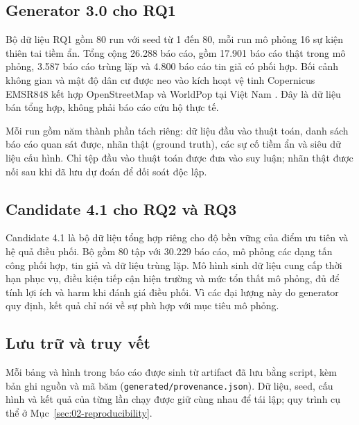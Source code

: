 \subsection{Generator 3.0 cho RQ1}
Bộ dữ liệu RQ1 gồm 80 run với seed từ 1 đến 80, mỗi run mô phỏng 16 sự kiện thiên tai tiềm ẩn. Tổng cộng 26.288 báo cáo, gồm 17.901 báo cáo thật trong mô phỏng, 3.587 báo cáo trùng lặp và 4.800 báo cáo tin giả có phối hợp. Bối cảnh không gian và mật độ dân cư được neo vào kích hoạt vệ tinh Copernicus EMSR848 kết hợp OpenStreetMap và WorldPop tại Việt Nam \citep{copernicusEMSR848,worldpop2025vietnam}. Đây là dữ liệu bán tổng hợp, không phải báo cáo cứu hộ thực tế.

Mỗi run gồm năm thành phần tách riêng: dữ liệu đầu vào thuật toán, danh sách báo cáo quan sát được, nhãn thật (ground truth), các sự cố tiềm ẩn và siêu dữ liệu cấu hình. Chỉ tệp đầu vào thuật toán được đưa vào suy luận; nhãn thật được nối sau khi đã lưu dự đoán để đối soát độc lập.

\subsection{Candidate 4.1 cho RQ2 và RQ3}
Candidate 4.1 là bộ dữ liệu tổng hợp riêng cho độ bền vững của điểm ưu tiên và hệ quả điều phối. Bộ gồm 80 tập với 30.229 báo cáo, mô phỏng các dạng tấn công phối hợp, tin giả và dữ liệu trùng lặp. Mô hình sinh dữ liệu cung cấp thời hạn phục vụ, điều kiện tiếp cận hiện trường và mức tổn thất mô phỏng, đủ để tính lợi ích và harm khi đánh giá điều phối. Vì các đại lượng này do generator quy định, kết quả chỉ nói về sự phù hợp với mục tiêu mô phỏng.

\subsection{Lưu trữ và truy vết}
Mỗi bảng và hình trong báo cáo được sinh từ artifact đã lưu bằng script, kèm bản ghi nguồn và mã băm (\texttt{generated/provenance.json}). Dữ liệu, seed, cấu hình và kết quả của từng lần chạy được giữ cùng nhau để tái lập; quy trình cụ thể ở Mục~\ref{sec:02-reproducibility}.
